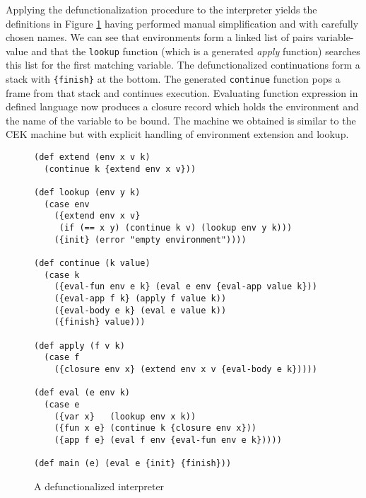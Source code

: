 Applying the defunctionalization procedure to the interpreter yields the definitions in Figure \ref{fig:defun-interp} having performed manual simplification and with carefully chosen names.
We can see that environments form a linked list of pairs variable-value and that the \texttt{lookup} function (which is a generated \textit{apply} function) searches this list for the first matching variable.
The defunctionalized continuations form a stack with \texttt{\{finish\}} at the bottom.
The generated \texttt{continue} function pops a frame from that stack and continues execution.
Evaluating function expression in defined language now produces a closure record which holds the environment and the name of the variable to be bound.
The machine we obtained is similar to the CEK \cite{Felleisen} machine but with explicit handling of environment extension and lookup.
\begin{figure}
    \centering
    \begin{verbatim}
(def extend (env x v k)
  (continue k {extend env x v}))

(def lookup (env y k)
  (case env
    ({extend env x v}
     (if (== x y) (continue k v) (lookup env y k)))
    ({init} (error "empty environment"))))

(def continue (k value)
  (case k
    ({eval-fun env e k} (eval e env {eval-app value k}))
    ({eval-app f k} (apply f value k))
    ({eval-body e k} (eval e value k))
    ({finish} value)))

(def apply (f v k)
  (case f 
    ({closure env x} (extend env x v {eval-body e k}))))

(def eval (e env k)
  (case e
    ({var x}   (lookup env x k))
    ({fun x e} (continue k {closure env x}))
    ({app f e} (eval f env {eval-fun env e k}))))
        
(def main (e) (eval e {init} {finish}))
    \end{verbatim}
    \caption{A defunctionalized interpreter}
    \label{fig:defun-interp}
\end{figure}
